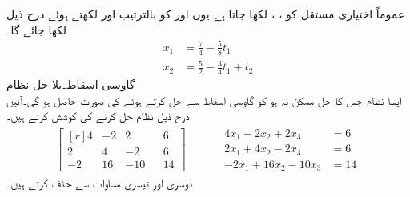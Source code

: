 عموماً اختیاری مستقل کو ، ،  لکھا جاتا ہے۔یوں  اور  کو بالترتیب  اور  لکھتے ہوئے درج ذیل لکھا جائے گا۔
\begin{align*}
x_1&=\tfrac{7}{4}-\tfrac{5}{8}t_1\\
x_2&=\tfrac{5}{2}-\tfrac{3}{4}t_1+t_2
\end{align*}
\quad گاوسی اسقاط۔بلا حل نظام\\
ایسا نظام جس کا حل ممکن نہ ہو کو گاوسی اسقاط سے حل کرتے ہوئے  کی صورت حاصل ہو گی۔آئیں درج ذیل نظام حل کرنے کی کوشش کرتے ہیں۔
\begin{gather*}
\begin{bmatrix*}[r] 4&-2&2&&6\\2&4&-2&&6\\-2&16&-10&&14  \end{bmatrix*}\quad \quad \quad 
\begin{aligned}
4x_1-2x_2+2x_3&=6\\
2x_1+4x_2-2x_3&=6\\
-2x_1+16x_2-10x_3&=14
\end{aligned}
\end{gather*}
دوسری اور تیسری مساوات سے  حذف کرتے ہیں۔

